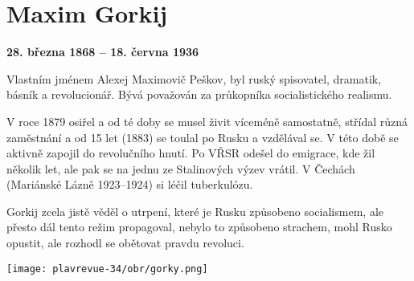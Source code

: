 \section{Maxim Gorkij}

\noindent
\textbf{28. března 1868 -- 18. června 1936}

\noindent
Vlastním jménem Alexej Maximovič Peškov, byl ruský spisovatel, dramatik, básník a revolucionář. Bývá považován za průkopníka socialistického realismu.

V roce 1879 osiřel a od té doby se musel živit víceméně samostatně, střídal různá zaměstnání a od 15 let (1883) se toulal po Rusku a vzdělával se. V této době se aktivně zapojil do revolučního hnutí. Po VŘSR odešel do emigrace, kde žil několik let, ale pak se na jednu ze Stalinových výzev vrátil. V Čechách (Mariánské Lázně 1923--1924) si léčil tuberkulózu.

Gorkij zcela jistě věděl o utrpení, které je Rusku způsobeno socialismem, ale přesto dál tento režim propagoval, nebylo to způsobeno strachem, mohl Rusko opustit, ale rozhodl se obětovat pravdu revoluci.


\begin{center}
\texttt{[image: plavrevue-34/obr/gorky.png]}
\end{center}
